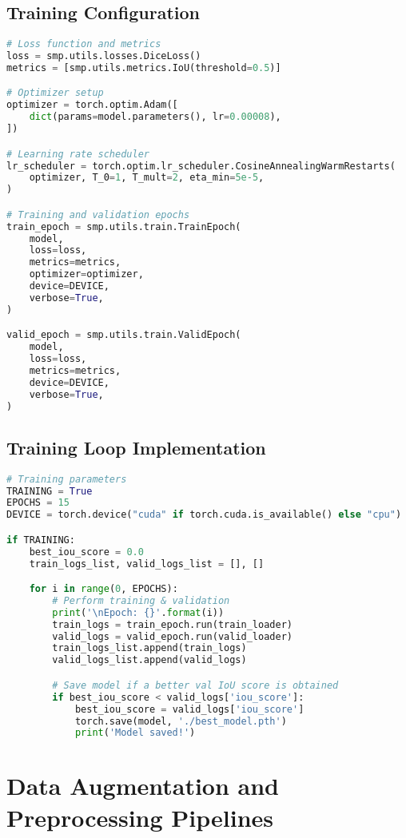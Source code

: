 \documentclass[12pt,a4paper]{report}
\begin{document}
\section{Training Configuration}
\begin{lstlisting}[language=Python, caption=Training Setup]
# Loss function and metrics
loss = smp.utils.losses.DiceLoss()
metrics = [smp.utils.metrics.IoU(threshold=0.5)]

# Optimizer setup
optimizer = torch.optim.Adam([
    dict(params=model.parameters(), lr=0.00008),
])

# Learning rate scheduler
lr_scheduler = torch.optim.lr_scheduler.CosineAnnealingWarmRestarts(
    optimizer, T_0=1, T_mult=2, eta_min=5e-5,
)

# Training and validation epochs
train_epoch = smp.utils.train.TrainEpoch(
    model,
    loss=loss,
    metrics=metrics,
    optimizer=optimizer,
    device=DEVICE,
    verbose=True,
)

valid_epoch = smp.utils.train.ValidEpoch(
    model,
    loss=loss,
    metrics=metrics,
    device=DEVICE,
    verbose=True,
)
\end{lstlisting}

\section{Training Loop Implementation}
\begin{lstlisting}[language=Python, caption=Training Loop]
# Training parameters
TRAINING = True
EPOCHS = 15
DEVICE = torch.device("cuda" if torch.cuda.is_available() else "cpu")

if TRAINING:
    best_iou_score = 0.0
    train_logs_list, valid_logs_list = [], []

    for i in range(0, EPOCHS):
        # Perform training & validation
        print('\nEpoch: {}'.format(i))
        train_logs = train_epoch.run(train_loader)
        valid_logs = valid_epoch.run(valid_loader)
        train_logs_list.append(train_logs)
        valid_logs_list.append(valid_logs)

        # Save model if a better val IoU score is obtained
        if best_iou_score < valid_logs['iou_score']:
            best_iou_score = valid_logs['iou_score']
            torch.save(model, './best_model.pth')
            print('Model saved!')
\end{lstlisting}

\chapter{Data Augmentation and Preprocessing Pipelines}
\end{document}
